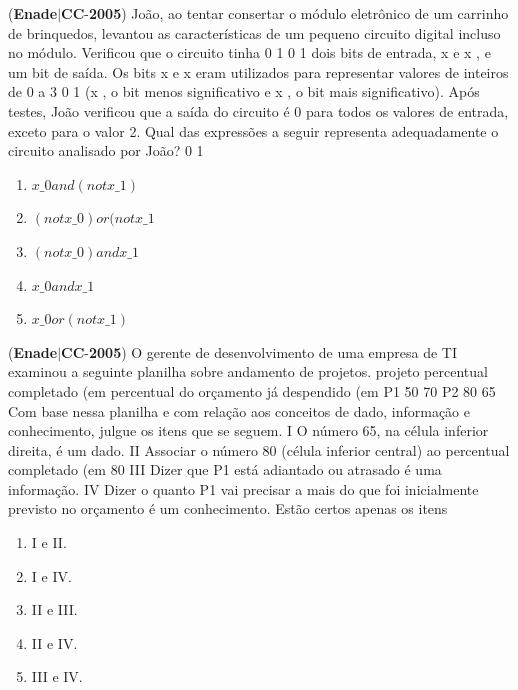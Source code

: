 \documentclass{exam}
\begin{document}
\begin{questions}
\question (\textbf{Enade}$|$\textbf{CC}-\textbf{2005}) João, ao tentar consertar o módulo eletrônico de um
carrinho de brinquedos, levantou as características de um pequeno
circuito digital incluso no módulo. Verificou que o circuito tinha
0 1 0 1
dois bits de entrada, x e x , e um bit de saída. Os bits x e x
eram utilizados para representar valores de inteiros de 0 a 3
0 1
(x , o bit menos significativo e x , o bit mais significativo).
Após testes, João verificou que a saída do circuito é 0 para
todos os valores de entrada, exceto para o valor 2.
Qual das expressões a seguir representa adequadamente o circuito
analisado por João?
0 1
	\begin{enumerate}[label=\alph*)]
		\item  $ x\_0 and (not x\_1 ) $
		\item  $ (not x\_0 ) or (not x\_1 $
		\item  $(not x\_0 ) and x\_1$
		\item  $x\_0 and x\_1$
		\item  $x\_0 or (not x\_1)$

	\end{enumerate}

\question (\textbf{Enade}$|$\textbf{CC}-\textbf{2005}) O gerente de desenvolvimento de uma empresa de
TI examinou a seguinte planilha sobre andamento de
projetos.
projeto
percentual
completado (em %
percentual do orçamento
já despendido (em %
P1 50 70
P2 80 65
Com base nessa planilha e com relação aos conceitos de dado,
informação e conhecimento, julgue os itens que se seguem.
I O número 65, na célula inferior direita, é um dado.
II Associar o número 80 (célula inferior central) ao percentual
completado (em %
80%
III Dizer que P1 está adiantado ou atrasado é uma informação.
IV Dizer o quanto P1 vai precisar a mais do que foi
inicialmente previsto no orçamento é um conhecimento.
Estão certos apenas os itens
	\begin{enumerate}[label=\alph*)]
		\item  I e II.
		\item  I e IV.
		\item  II e III.
		\item  II e IV.
		\item  III e IV.

	\end{enumerate}


\end{questions}
\end{document}
